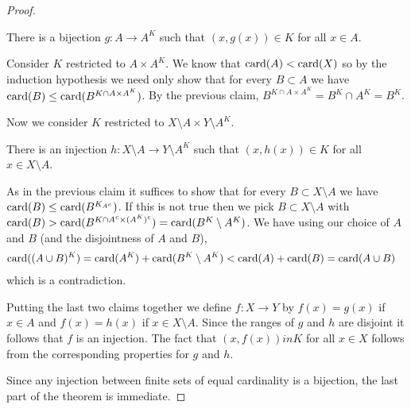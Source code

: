 \begin{proof}
\begin{clm}There is a bijection $g : A \to A^K$ such that $(x,g(x)) \in K$ for all $x \in A$.
\end{clm}
Consider $K$ restricted to $A \times A^K$.  We know that $\operatorname*{card}(A) < \operatorname*{card}(X)$ so by the induction hypothesis we need only show that for 
every $B \subset A$ we have $\operatorname*{card}(B) \leq \operatorname*{card}(B^{K \cap A \times A^K})$.  By the previous claim, $B^{K \cap A \times A^K} = B^K \cap A^K = B^K$.

Now we consider $K$ restricted to $X \setminus A \times Y \setminus A^K$.  
\begin{clm}There is an injection $h : X \setminus A \to Y \setminus A^K$ such that $(x,h(x)) \in K$ for all $x \in X \setminus A$.
\end{clm}
As in the previous claim it suffices to show that for every $B \subset X \setminus A$ we have $\operatorname*{card}(B) \leq \operatorname*{card}(B^{K_{A^c}})$.  If this is not true then
we pick $B \subset X \setminus A$ with $\operatorname*{card}(B) > \operatorname*{card}(B^{K \cap A^c \times (A^K)^c}) = \operatorname*{card}(B^K \setminus A^K)$.  We have using our choice of $A$ and $B$ (and the disjointness of $A$ and $B$),
\begin{align*}
\operatorname*{card}((A \cup B)^K) &= \operatorname*{card}(A^K) + \operatorname*{card}(B^K \setminus A^K) < \operatorname*{card}(A) + \operatorname*{card}(B)  = \operatorname*{card}(A \cup B)
\end{align*}
which is a contradiction.

Putting the last two claims together we define $f : X \to Y$ by $f(x) = g(x)$ if $x \in A$ and $f(x) = h(x)$ if $x \in X \setminus A$.  Since the ranges of $g$ and $h$ are disjoint it follows that $f$ is an injection.  The fact that $(x,f(x)) in K$ for all $x \in X$ follows from the corresponding properties for $g$ and $h$.

Since any injection between finite sets of equal cardinality is a bijection, the last part of the theorem is immediate.
\end{proof}


